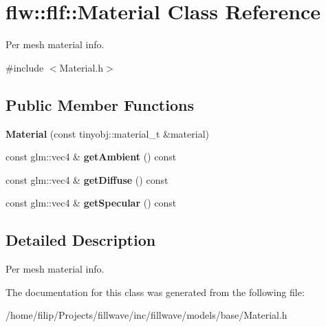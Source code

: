 \hypertarget{classflw_1_1flf_1_1Material}{}\section{flw\+:\+:flf\+:\+:Material Class Reference}
\label{classflw_1_1flf_1_1Material}


Per mesh material info.  




{\ttfamily \#include $<$Material.\+h$>$}

\subsection*{Public Member Functions}
\begin{DoxyCompactItemize}
\item 
{\bfseries Material} (const tinyobj\+::material\+\_\+t \&material)\hypertarget{classflw_1_1flf_1_1Material_a78fdabb0c96712b35ca5d91ba8b66713}{}\label{classflw_1_1flf_1_1Material_a78fdabb0c96712b35ca5d91ba8b66713}

\item 
const glm\+::vec4 \& {\bfseries get\+Ambient} () const \hypertarget{classflw_1_1flf_1_1Material_a8c0e513fe5295bb37b4a98ebf783d355}{}\label{classflw_1_1flf_1_1Material_a8c0e513fe5295bb37b4a98ebf783d355}

\item 
const glm\+::vec4 \& {\bfseries get\+Diffuse} () const \hypertarget{classflw_1_1flf_1_1Material_ac6bd61520e666c51532057bb7a608556}{}\label{classflw_1_1flf_1_1Material_ac6bd61520e666c51532057bb7a608556}

\item 
const glm\+::vec4 \& {\bfseries get\+Specular} () const \hypertarget{classflw_1_1flf_1_1Material_a47e778f1911804ea9614cfb026c90999}{}\label{classflw_1_1flf_1_1Material_a47e778f1911804ea9614cfb026c90999}

\end{DoxyCompactItemize}


\subsection{Detailed Description}
Per mesh material info. 

The documentation for this class was generated from the following file\+:\begin{DoxyCompactItemize}
\item 
/home/filip/\+Projects/fillwave/inc/fillwave/models/base/Material.\+h\end{DoxyCompactItemize}
